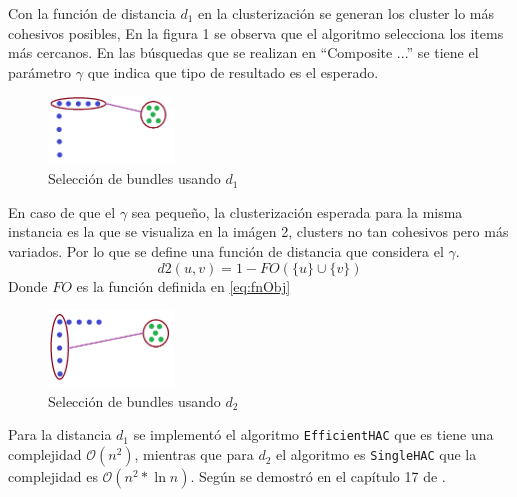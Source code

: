 Con la función de distancia $d_{1}$ en la clusterización se generan los cluster lo más cohesivos posibles,
En la figura 1 se observa que el algoritmo selecciona los items más cercanos. En las búsquedas que 
se realizan en ``Composite ...''\cite{compositeRetrival} se tiene el parámetro $\gamma$ que indica 
que tipo de resultado es el esperado. 

\begin{figure}[H]
  \centering
    \includegraphics[width=0.3\textwidth]{img/cluster2.png}
  \caption{Selección de bundles usando $d_{1}$}
  \label{res:img-usingEfficientHAC}
\end{figure}

En caso de que el $\gamma$ sea pequeño, la 
clusterización esperada para la misma instancia es la que se visualiza en la imágen 2, clusters no 
tan cohesivos pero más variados. Por lo que se define una función de distancia que considera el 
$\gamma$.\\
\begin{equation}
d2(u,v) = 1 - FO(\{u\} \cup \{v\})
\end{equation}
Donde $FO$ es la función definida en \eqref{eq:fnObj} \\

\begin{figure}[H]
  \centering
    \includegraphics[width=0.3\textwidth]{img/cluster1.png}
  \caption{Selección de bundles usando $d_{2}$}
  \label{res:img-usingSingleHAC}
\end{figure}

Para la distancia $d_{1}$ se implementó el algoritmo \texttt{EfficientHAC} que es tiene una 
complejidad $\mathcal{O}(n^{2})$, mientras que para $d_{2}$ el algoritmo es \texttt{SingleHAC} que 
la complejidad es $\mathcal{O}(n^{2} * \ln{n})$. Según se demostró en el capítulo 17 de 
\cite{informationRetrival}.


